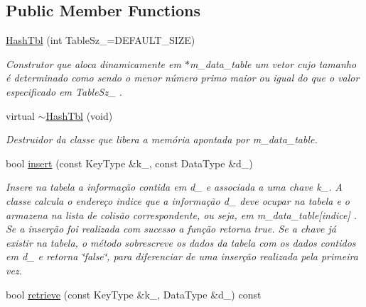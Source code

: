 \subsection*{Public Member Functions}
\begin{DoxyCompactItemize}
\item 
\hyperlink{classMyHashTable_1_1HashTbl_af870c1ca95e7d888b3df67f4fb8f977a}{Hash\+Tbl} (int Table\+Sz\+\_\+=D\+E\+F\+A\+U\+L\+T\+\_\+\+S\+I\+ZE)\hypertarget{classMyHashTable_1_1HashTbl_af870c1ca95e7d888b3df67f4fb8f977a}{}\label{classMyHashTable_1_1HashTbl_af870c1ca95e7d888b3df67f4fb8f977a}

\begin{DoxyCompactList}\small\item\em Construtor que aloca dinamicamente em $\ast$m\+\_\+data\+\_\+table um vetor cujo tamanho é determinado como sendo o menor número primo maior ou igual do que o valor especificado em Table\+Sz\+\_\+ . \end{DoxyCompactList}\item 
virtual \hyperlink{classMyHashTable_1_1HashTbl_a07aa99ea74d96249b56ed4cc0c357491}{$\sim$\+Hash\+Tbl} (void)\hypertarget{classMyHashTable_1_1HashTbl_a07aa99ea74d96249b56ed4cc0c357491}{}\label{classMyHashTable_1_1HashTbl_a07aa99ea74d96249b56ed4cc0c357491}

\begin{DoxyCompactList}\small\item\em Destruidor da classe que libera a memória apontada por m\+\_\+data\+\_\+table. \end{DoxyCompactList}\item 
bool \hyperlink{classMyHashTable_1_1HashTbl_aaa766464157a57339e0fe03b828c39a6}{insert} (const Key\+Type \&k\+\_\+, const Data\+Type \&d\+\_\+)\hypertarget{classMyHashTable_1_1HashTbl_aaa766464157a57339e0fe03b828c39a6}{}\label{classMyHashTable_1_1HashTbl_aaa766464157a57339e0fe03b828c39a6}

\begin{DoxyCompactList}\small\item\em Insere na tabela a informação contida em d\+\_\+ e associada a uma chave k\+\_\+. A classe calcula o endereço \textquotesingle{}indice\textquotesingle{} que a informação d\+\_\+ deve ocupar na tabela e o armazena na lista de colisão correspondente, ou seja, em m\+\_\+data\+\_\+table\mbox{[}indice\mbox{]} . Se a inserção foi realizada com sucesso a função retorna true. Se a chave já existir na tabela, o método sobrescreve os dados da tabela com os dados contidos em d\+\_\+ e retorna \char`\"{}false\char`\"{}, para diferenciar de uma inserção realizada pela primeira vez. \end{DoxyCompactList}\item 
bool \hyperlink{classMyHashTable_1_1HashTbl_a964cfb4a5833ba52cee5489075a5e645}{retrieve} (const Key\+Type \&k\+\_\+, Data\+Type \&d\+\_\+) const \hypertarget{classMyHashTable_1_1HashTbl_a964cfb4a5833ba52cee5489075a5e645}{}\label{classMyHashTable_1_1HashTbl_a964cfb4a5833ba52cee5489075a5e645}


\end{DoxyCompactItemize}
